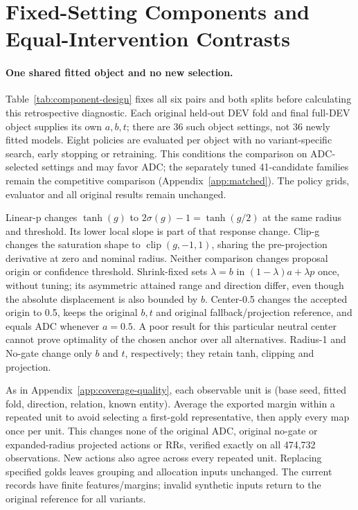 \documentclass[11pt,a4paper]{article}
\newcommand{\clip}{\operatorname{clip}}
\begin{document}
\section{Fixed-Setting Components and Equal-Intervention Contrasts}
\label{app:component-ablation}

\paragraph{One shared fitted object and no new selection.}
Table~\ref{tab:component-design} fixes all six pairs and both splits before calculating this retrospective diagnostic. Each original held-out DEV fold and final full-DEV object supplies its own $a,b,t$; there are 36 such object settings, not 36 newly fitted models. Eight policies are evaluated per object with no variant-specific search, early stopping or retraining. This conditions the comparison on ADC-selected settings and may favor ADC; the separately tuned 41-candidate families remain the competitive comparison (Appendix~\ref{app:matched}). The policy grids, evaluator and all original results remain unchanged.

Linear-p changes $\tanh(g)$ to $2\sigma(g)-1=\tanh(g/2)$ at the same radius and threshold. Its lower local slope is part of that response change. Clip-g changes the saturation shape to $\clip(g,-1,1)$, sharing the pre-projection derivative at zero and nominal radius. Neither comparison changes proposal origin or confidence threshold. Shrink-fixed sets $\lambda=b$ in $(1-\lambda)a+\lambda p$ once, without tuning; its asymmetric attained range and direction differ, even though the absolute displacement is also bounded by $b$. Center-0.5 changes the accepted origin to 0.5, keeps the original $b,t$ and original fallback/projection reference, and equals ADC whenever $a=0.5$. A poor result for this particular neutral center cannot prove optimality of the chosen anchor over all alternatives. Radius-1 and No-gate change only $b$ and $t$, respectively; they retain tanh, clipping and projection.

As in Appendix~\ref{app:coverage-quality}, each observable unit is (base seed, fitted fold, direction, relation, known entity). Average the exported margin within a repeated unit to avoid selecting a first-gold representative, then apply every map once per unit. This changes none of the original ADC, original no-gate or expanded-radius projected actions or RRs, verified exactly on all 474,732 observations. New actions also agree across every repeated unit. Replacing specified golds leaves grouping and allocation inputs unchanged. The current records have finite features/margins; invalid synthetic inputs return to the original reference for all variants.
\end{document}
